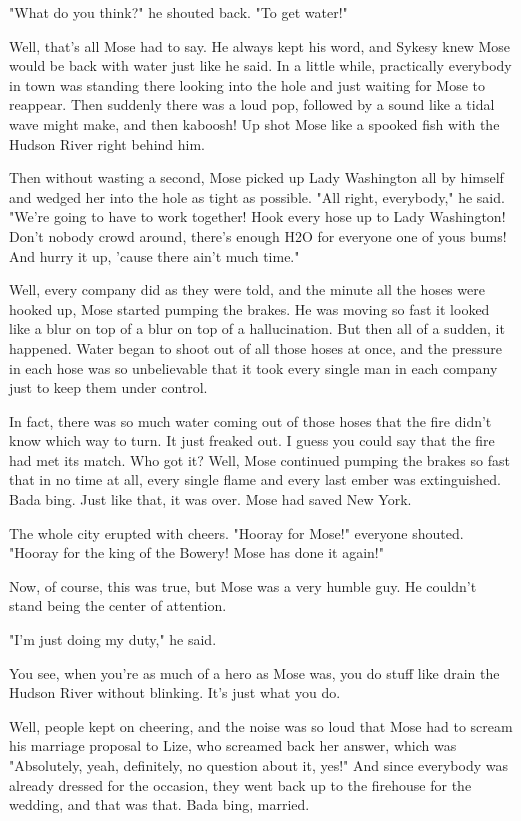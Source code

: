 "What do you think?" he shouted back. "To get water!"

Well, that's all Mose had to say. He always kept his word, and Sykesy knew Mose would be back with water just like he said. In a little while, practically everybody in town was standing there looking into the hole and just waiting for Mose to reappear. Then suddenly there was a loud pop, followed by a sound like a tidal wave might make, and then kaboosh! Up shot Mose like a spooked fish with the Hudson River right behind him.

Then without wasting a second, Mose picked up Lady Washington all by himself and wedged her into the hole as tight as possible. "All right, everybody," he said. "We're going to have to work together! Hook every hose up to Lady Washington! Don't nobody crowd around, there's enough H2O for everyone one of yous bums! And hurry it up, 'cause there ain't much time."

Well, every company did as they were told, and the minute all the hoses were hooked up, Mose started pumping the brakes. He was moving so fast it looked like a blur on top of a blur on top of a hallucination. But then all of a sudden, it happened. Water began to shoot out of all those hoses at once, and the pressure in each hose was so unbelievable that it took every single man in each company just to keep them under control.

In fact, there was so much water coming out of those hoses that the fire didn't know which way to turn. It just freaked out. I guess you could say that the fire had met its match. Who got it? Well, Mose continued pumping the brakes so fast that in no time at all, every single flame and every last ember was extinguished. Bada bing. Just like that, it was over. Mose had saved New York.

The whole city erupted with cheers. "Hooray for Mose!" everyone shouted. "Hooray for the king of the Bowery! Mose has done it again!"

Now, of course, this was true, but Mose was a very humble guy. He couldn't stand being the center of attention.

"I'm just doing my duty," he said.

You see, when you're as much of a hero as Mose was, you do stuff like drain the Hudson River without blinking. It's just what you do.

Well, people kept on cheering, and the noise was so loud that Mose had to scream his marriage proposal to Lize, who screamed back her answer, which was "Absolutely, yeah, definitely, no question about it, yes!" And since everybody was already dressed for the occasion, they went back up to the firehouse for the wedding, and that was that. Bada bing, married.

